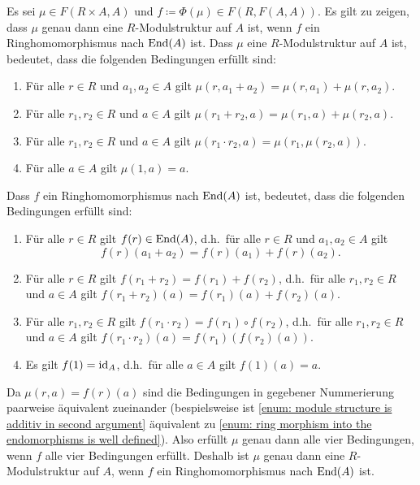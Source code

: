 \documentclass[a4paper, 10pt, numbers=noenddot]{scrartcl}
\begin{document}
Es sei $\mu \in F(R \times A, A)$ und $f \coloneqq \Phi(\mu) \in F(R, F(A,A))$.
Es gilt zu zeigen, dass $\mu$ genau dann eine $R$-Modulstruktur auf $A$ ist, wenn $f$ ein Ringhomomorphismus nach $\operatorname{End}(A)$ ist.
Dass $\mu$ eine $R$-Modulstruktur auf $A$ ist, bedeutet, dass die folgenden Bedingungen erfüllt sind:
\begin{enumerate}[label = (M\arabic*)]
  \item
    \label{enum: module structure is additiv in second argument}
    Für alle $r \in R$ und $a_1, a_2 \in A$ gilt $\mu(r, a_1 + a_2) = \mu(r, a_1) + \mu(r, a_2)$.
  \item
    Für alle $r_1, r_2 \in R$ und $a \in A$ gilt $\mu(r_1 + r_2, a) = \mu(r_1, a) + \mu(r_2, a)$.
  \item
    Für alle $r_1, r_2 \in R$ und $a \in A$ gilt $\mu(r_1 \cdot r_2, a) = \mu(r_1, \mu(r_2, a))$.
  \item
    Für alle $a \in A$ gilt $\mu(1, a) = a$.
\end{enumerate}
Dass $f$ ein Ringhomomorphismus nach $\operatorname{End}(A)$ ist, bedeutet, dass die folgenden Bedingungen erfüllt sind:
\begin{enumerate}[label = (R\arabic*)]
  \item
    \label{enum: ring morphism into the endomorphisms is well defined}
    Für alle $r \in R$ gilt $f(r) \in \operatorname{End}(A)$, d.h.\ für alle $r \in R$ und $a_1, a_2 \in A$ gilt
    \[
      f(r)(a_1 + a_2) = f(r)(a_1) + f(r)(a_2).
    \]
  \item
    Für alle $r \in R$ gilt $f(r_1 + r_2) = f(r_1) + f(r_2)$, d.h.\ für alle $r_1, r_2 \in R$ und $a \in A$ gilt $f(r_1 + r_2)(a) = f(r_1)(a) + f(r_2)(a)$.
  \item
    Für alle $r_1, r_2 \in R$ gilt $f(r_1 \cdot r_2) = f(r_1) \circ f(r_2)$, d.h.\ für alle $r_1, r_2 \in R$ und $a \in A$ gilt $f(r_1 \cdot r_2)(a) = f(r_1)( f(r_2)(a) )$.
  \item
    Es gilt $f(1) = \operatorname{id}_A$, d.h.\ für alle $a \in A$ gilt $f(1)(a) = a$.
\end{enumerate}
Da $\mu(r,a) = f(r)(a)$ sind die Bedingungen in gegebener Nummerierung paarweise äquivalent zueinander (bespielsweise ist \ref{enum: module structure is additiv in second argument} äquivalent zu \ref{enum: ring morphism into the endomorphisms is well defined}).
Also erfüllt $\mu$ genau dann alle vier Bedingungen, wenn $f$ alle vier Bedingungen erfüllt.
Deshalb ist $\mu$ genau dann eine $R$-Modulstruktur auf $A$, wenn $f$ ein Ringhomomorphismus nach $\operatorname{End}(A)$ ist.
\end{document}
